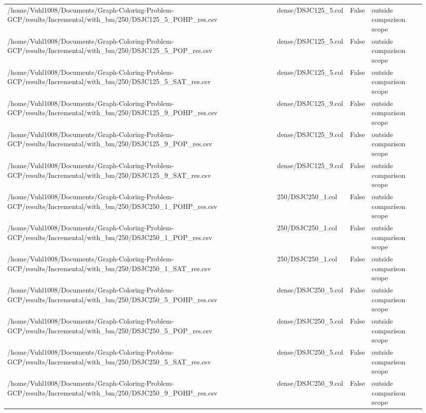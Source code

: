 \begin{table}[htbp]
\begin{tabular}{llll}
/home/Vuhl1008/Documents/Graph-Coloring-Problem-GCP/results/Incremental/with\_bm/250/DSJC125\_5\_POHP\_res.csv & dense/DSJC125\_5.col & False & outside comparison scope \\
/home/Vuhl1008/Documents/Graph-Coloring-Problem-GCP/results/Incremental/with\_bm/250/DSJC125\_5\_POP\_res.csv & dense/DSJC125\_5.col & False & outside comparison scope \\
/home/Vuhl1008/Documents/Graph-Coloring-Problem-GCP/results/Incremental/with\_bm/250/DSJC125\_5\_SAT\_res.csv & dense/DSJC125\_5.col & False & outside comparison scope \\
/home/Vuhl1008/Documents/Graph-Coloring-Problem-GCP/results/Incremental/with\_bm/250/DSJC125\_9\_POHP\_res.csv & dense/DSJC125\_9.col & False & outside comparison scope \\
/home/Vuhl1008/Documents/Graph-Coloring-Problem-GCP/results/Incremental/with\_bm/250/DSJC125\_9\_POP\_res.csv & dense/DSJC125\_9.col & False & outside comparison scope \\
/home/Vuhl1008/Documents/Graph-Coloring-Problem-GCP/results/Incremental/with\_bm/250/DSJC125\_9\_SAT\_res.csv & dense/DSJC125\_9.col & False & outside comparison scope \\
/home/Vuhl1008/Documents/Graph-Coloring-Problem-GCP/results/Incremental/with\_bm/250/DSJC250\_1\_POHP\_res.csv & 250/DSJC250\_1.col & False & outside comparison scope \\
/home/Vuhl1008/Documents/Graph-Coloring-Problem-GCP/results/Incremental/with\_bm/250/DSJC250\_1\_POP\_res.csv & 250/DSJC250\_1.col & False & outside comparison scope \\
/home/Vuhl1008/Documents/Graph-Coloring-Problem-GCP/results/Incremental/with\_bm/250/DSJC250\_1\_SAT\_res.csv & 250/DSJC250\_1.col & False & outside comparison scope \\
/home/Vuhl1008/Documents/Graph-Coloring-Problem-GCP/results/Incremental/with\_bm/250/DSJC250\_5\_POHP\_res.csv & dense/DSJC250\_5.col & False & outside comparison scope \\
/home/Vuhl1008/Documents/Graph-Coloring-Problem-GCP/results/Incremental/with\_bm/250/DSJC250\_5\_POP\_res.csv & dense/DSJC250\_5.col & False & outside comparison scope \\
/home/Vuhl1008/Documents/Graph-Coloring-Problem-GCP/results/Incremental/with\_bm/250/DSJC250\_5\_SAT\_res.csv & dense/DSJC250\_5.col & False & outside comparison scope \\
/home/Vuhl1008/Documents/Graph-Coloring-Problem-GCP/results/Incremental/with\_bm/250/DSJC250\_9\_POHP\_res.csv & dense/DSJC250\_9.col & False & outside comparison scope \\

\end{tabular}
\end{table}
